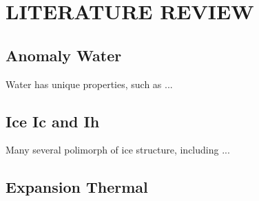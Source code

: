 \chapter{LITERATURE REVIEW}
\section{Anomaly Water}
Water has unique properties, such as \cite{Petrenko2010} ... 

\section{Ice Ic and Ih}
Many several polimorph of ice structure, including ...

\section{Expansion Thermal}
